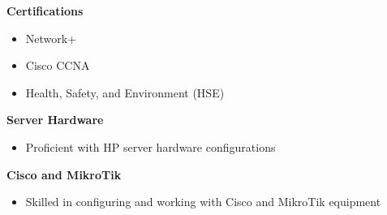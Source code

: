 \begin{paracol}{3}
		\begin{onecolentry}
		\textbf{Certifications}
		\begin{itemize}[leftmargin=0.5cm, itemsep=0.1cm]
			\item Network+
			\item Cisco CCNA
			\item Health, Safety, and Environment (HSE)
		\end{itemize}
	\end{onecolentry}
		\switchcolumn
	\begin{onecolentry}
		\textbf{Server Hardware}
		\begin{itemize}[leftmargin=0.5cm, itemsep=0.1cm]
			\item Proficient with HP server hardware configurations
		\end{itemize}
	\end{onecolentry}
	
	\switchcolumn
	\begin{onecolentry}
		\textbf{Cisco and MikroTik}
		\begin{itemize}[leftmargin=0.5cm, itemsep=0.1cm]
			\item Skilled in configuring and working with Cisco and MikroTik equipment
		\end{itemize}
	\end{onecolentry}
\end{paracol}



